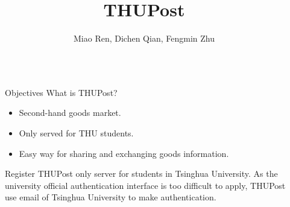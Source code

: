 \documentclass[final]{beamer}
\title{THUPost} %
\author{Miao Ren, Dichen Qian, Fengmin Zhu} %
\institute{2016} %
\newlength{\sepwid}
\newlength{\onecolwid}
\begin{document}

\setlength{\belowcaptionskip}{2ex} %
\setlength\belowdisplayshortskip{2ex} %

\begin{frame}[t] %

\begin{columns}[t] %

    \begin{column}{\sepwid}\end{column} %

    \begin{column}{\onecolwid} %


        \begin{alertblock}{Objectives}
        What is THUPost?
        \begin{itemize}
        \item Second-hand goods market.
        \item Only served for THU students.
        \item Easy way for sharing and exchanging goods information.
        \end{itemize}

        \end{alertblock}


        \begin{block}{Register}
        THUPost only server for students in Tsinghua University. As the university official authentication interface is too difficult to apply, THUPost use email of Tsinghua University to make authentication.


\end{block}
\end{column}
\end{columns}
\end{frame}
\end{document}
